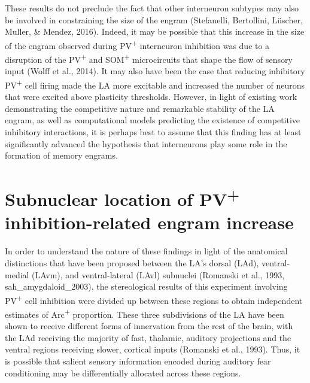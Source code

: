\documentclass[12pt,a4paper,]{report}
\begin{document}
These results do not preclude the fact that other interneuron subtypes
may also be involved in constraining the size of the engram (Stefanelli,
Bertollini, Lüscher, Muller, \& Mendez, 2016). Indeed, it may be
possible that this increase in the size of the engram observed during
PV\textsuperscript{+} interneuron inhibition was due to a disruption of
the PV\textsuperscript{+} and SOM\textsuperscript{+} microcircuits that
shape the flow of sensory input (Wolff et al., 2014). It may also have
been the case that reducing inhibitory PV\textsuperscript{+} cell firing
made the LA more excitable and increased the number of neurons that were
excited above plasticity thresholds. However, in light of existing work
demonstrating the competitive nature and remarkable stability of the LA
engram, as well as computational models predicting the existence of
competitive inhibitory interactions, it is perhaps best to assume that
this finding has at least significantly advanced the hypothesis that
interneurons play some role in the formation of memory engrams.

\section{\texorpdfstring{Subnuclear location of PV\textsuperscript{+}
inhibition-related engram
increase}{Subnuclear location of PV+ inhibition-related engram increase}}\label{subnuclear-location-of-pv-inhibition-related-engram-increase}

In order to understand the nature of these findings in light of the
anatomical distinctions that have been proposed between the LA's dorsal
(LAd), ventral-medial (LAvm), and ventral-lateral (LAvl) subnuclei
(Romanski et al., 1993, sah\_amygdaloid\_2003), the stereological
results of this experiment involving PV\textsuperscript{+} cell
inhibition were divided up between these regions to obtain independent
estimates of Arc\textsuperscript{+} proportion. These three subdivisions
of the LA have been shown to receive different forms of innervation from
the rest of the brain, with the LAd receiving the majority of fast,
thalamic, auditory projections and the ventral regions receiving slower,
cortical inputs (Romanski et al., 1993). Thus, it is possible that
salient sensory information encoded during auditory fear conditioning
may be differentially allocated across these regions.
\end{document}
